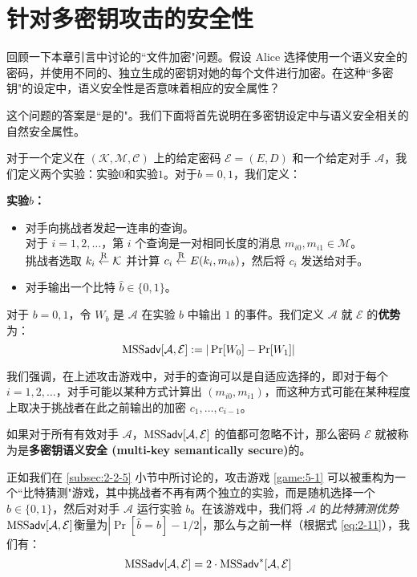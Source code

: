 \section{针对多密钥攻击的安全性}

回顾一下本章引言中讨论的``文件加密"问题。假设 Alice 选择使用一个语义安全的密码，并使用不同的、独立生成的密钥对她的每个文件进行加密。在这种``多密钥"的设定中，语义安全性是否意味着相应的安全属性？

这个问题的答案是``是的"。我们下面将首先说明在多密钥设定中与语义安全相关的自然安全属性。

\begin{game}[多密钥语义安全性]\label{game:5-1}
对于一个定义在 $(\mathcal{K},\mathcal{M},\mathcal{C})$ 上的给定密码 $\mathcal{E}=(E,D)$ 和一个给定对手 $\mathcal{A}$，我们定义两个实验：实验$0$和实验$1$。对于$b=0,1$，我们定义：

\noindent\textbf{实验$b$：}
\begin{itemize}
	\item 对手向挑战者发起一连串的查询。\\
	对于 $i=1,2,\dots$，第 $i$ 个查询是一对相同长度的消息 $m_{i0},m_{i1}\in\mathcal{M}$。\\
	挑战者选取 $k_i\overset{\rm R}\leftarrow\mathcal{K}$ 并计算 $c_i\overset{\rm R}\leftarrow E(k_i,m_{ib})$，然后将 $c_i$ 发送给对手。
	\item 对手输出一个比特 $\hat{b}\in\{0,1\}$。
\end{itemize}

对于 $b=0,1$，令 $W_b$ 是 $\mathcal{A}$ 在实验 $b$ 中输出 $1$ 的事件。我们定义 $\mathcal{A}$ 就 $\mathcal{E}$ 的\textbf{优势}为：
\[
{\rm MSS}\mathsf{adv}[\mathcal{A},\mathcal{E}]:=|\Pr[W_0]-\Pr[W_1]|
\]
\end{game}

我们强调，在上述攻击游戏中，对手的查询可以是自适应选择的，即对于每个 $i=1,2,\dots$，对手可能以某种方式计算出 $(m_{i0},m_{i1})$，而这种方式可能在某种程度上取决于挑战者在此之前输出的加密 $c_1,\dots,c_{i-1}$。

\begin{definition}[多密钥语义安全性]\label{def:5-1}
如果对于所有有效对手 $\mathcal{A}$，${\rm MSS}\mathsf{adv}[\mathcal{A},\mathcal{E}]$ 的值都可忽略不计，那么密码 $\mathcal{E}$ 就被称为是\textbf{多密钥语义安全 (multi-key semantically secure)}的。
\end{definition}

正如我们在 \ref{subsec:2-2-5} 小节中所讨论的，攻击游戏 \ref{game:5-1} 可以被重构为一个``比特猜测"游戏，其中挑战者不再有两个独立的实验，而是随机选择一个 ${b}\in\{0,1\}$，然后对对手 $\mathcal{A}$ 运行实验 $b$。在该游戏中，我们将 $\mathcal{A}$ 的\emph{比特猜测优势}${\rm MSS}\mathsf{adv}[\mathcal{A},\mathcal{E}]$衡量为$|\Pr[\hat{b}=b]-{1}/{2}|$，那么与之前一样（根据式 \ref{eq:2-11}），我们有：
\begin{equation}\label{eq:5-1}
{\rm MSS}\mathsf{adv}[\mathcal{A},\mathcal{E}]= 2\cdot{\rm MSS}\mathsf{adv}^*[\mathcal{A},\mathcal{E}]
\end{equation}

